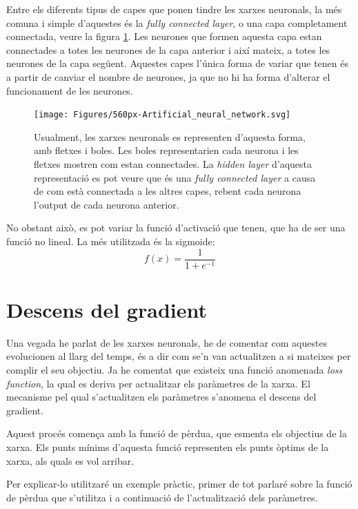 Entre els diferents tipus de capes que ponen tindre les xarxes neuronals, la més comuna i simple d'aquestes és la \textit{fully connected layer}, o una capa completament connectada, veure la figura \ref{fig:560px-artificialneuralnetwork}. Les neurones que formen aquesta capa estan connectades a totes les neurones de la capa anterior i així mateix, a totes les neurones de la capa següent. Aquestes capes l'única forma de variar que tenen és a partir de canviar el nombre de neurones, ja que no hi ha forma d'alterar el funcionament de les neurones.
\begin{figure}[H]
	\centering
	\texttt{[image: Figures/560px-Artificial\_neural\_network.svg]}
	\caption{Usualment, les xarxes neuronals es representen d'aquesta forma, amb fletxes i boles. Les boles representarien cada neurona i les fletxes mostren com estan connectades. La \textit{hidden layer} d'aquesta representació es pot veure que és una \textit{fully connected layer} a causa de com està connectada a les altres capes, rebent cada neurona l'output de cada neurona anterior.}
	\label{fig:560px-artificialneuralnetwork}
\end{figure}
No obstant això, es pot variar la funció d'activació que tenen, que ha de ser una funció no lineal. La més utilitzada és la sigmoide:
$$
f(x) = \frac{1}{1+e^{-1}}
$$

\section{Descens del gradient}
Una vegada he parlat de les xarxes neuronals, he de comentar com aquestes evolucionen al llarg del temps, és a dir com se'n van actualitzen a si mateixes per complir el seu objectiu. Ja he comentat que existeix una funció anomenada \textit{loss function}, la qual es deriva per actualitzar els paràmetres de la xarxa. El mecanisme pel qual s'actualitzen els paràmetres s'anomena el descens del gradient.

Aquest procés comença amb la funció de pèrdua, que esmenta els objectius de la xarxa. Els punts mínims d'aquesta funció representen els punts òptims de la xarxa, als quals es vol arribar. 

 Per explicar-lo utilitzaré un exemple pràctic, primer de tot parlaré sobre la funció de pèrdua que s'utilitza i a continuació de l'actualització dels paràmetres. 
 
